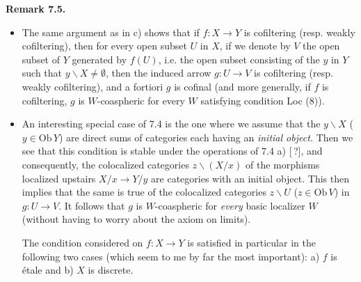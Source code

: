 \documentclass[11pt]{article}
\newcommand{\printedpage}[1]{\marginpar{\footnotesize p.~#1}}
\newcommand{\msp}[1]{\marginpar{\footnotesize [#1]}}
\newcommand{\Ob}{\mathrm{Ob}}
\begin{document}
\noindent\textbf{Remark 7.5.}
\begin{itemize}
\item[1)] The same argument as in c) shows that if $f : X \longrightarrow Y$ is cofiltering (resp. weakly cofiltering), then for every open subset $U$ in $X$, if we denote by $V$ the open subset of $Y$ generated by $f(U)$, i.e. the open subset consisting of the $y$ in $Y$ such that $y\backslash X \neq \emptyset$, then the induced arrow $g : U \longrightarrow V$ is cofiltering (resp. weakly cofiltering), and a fortiori $g$ is cofinal (and more generally, if $f$ is cofiltering, $g$ is $W$-coaspheric for every $W$ satisfying condition Loc (8)).

\msp{page 96}
\item[2)] An interesting special case of 7.4 is the one where we assume that the $y\backslash X$ ($y \in \Ob\,Y$) are direct sums of categories each having an \textit{initial object.} Then we see that this condition is stable under the operations of 7.4 a) [\,?], and consequently, the colocalized categories $z\backslash(X/x)$ of the morphisms localized upstairs $X/x \longrightarrow Y/y$ are categories with an initial object. This then implies that the same is true of the colocalized categories $z\backslash U$ ($z \in \Ob\,V$) in $g : U \longrightarrow V$. It follows that $g$ is $W$-coaspheric for \textit{every} basic localizer $W$ (without having to worry about the axiom on limits).

The condition considered on $f : X \longrightarrow Y$ is satisfied in particular in the following two cases (which seem to me by far the most important): a) $f$ is étale and b) $X$ is discrete.
\end{itemize}

\clearpage
\printedpage{60}

\msp{page 97}
\end{document}
